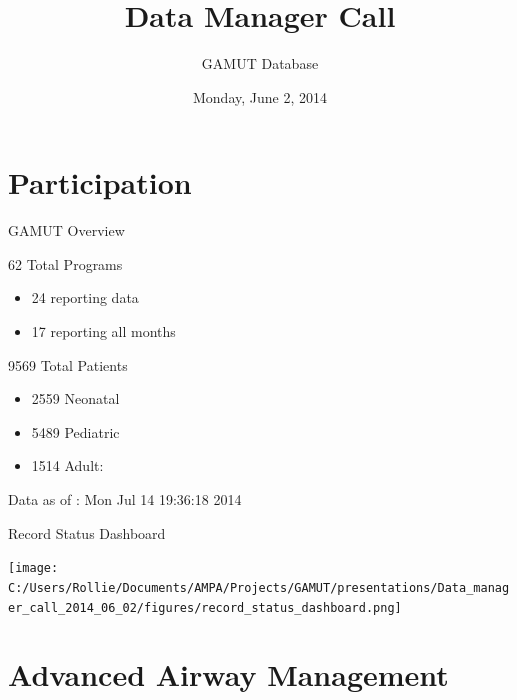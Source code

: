 \documentclass[ignorenonframetext,]{beamer}
\title{Data Manager Call}
\author{GAMUT Database}
\date{Monday, June 2, 2014}
\begin{document}
\frame{\titlepage}

\section{Participation}\label{participation}

\begin{frame}{GAMUT Overview}

\begin{block}{62 Total Programs}

\begin{itemize}
\itemsep1pt\parskip0pt
\item
  24 reporting data\\
\item
  17 reporting all months
\end{itemize}

\end{block}

\begin{block}{9569 Total Patients}

\begin{itemize}
\itemsep1pt\parskip0pt
\item
  2559 Neonatal\\
\item
  5489 Pediatric\\
\item
  1514 Adult:
\end{itemize}

Data as of : Mon Jul 14 19:36:18 2014

\end{block}

\end{frame}

\begin{frame}{Record Status Dashboard}

\texttt{[image: C:/Users/Rollie/Documents/AMPA/Projects/GAMUT/presentations/Data\_manager\_call\_2014\_06\_02/figures/record\_status\_dashboard.png]}

\end{frame}

\section{Advanced Airway Management}\label{advanced-airway-management}
\end{document}
